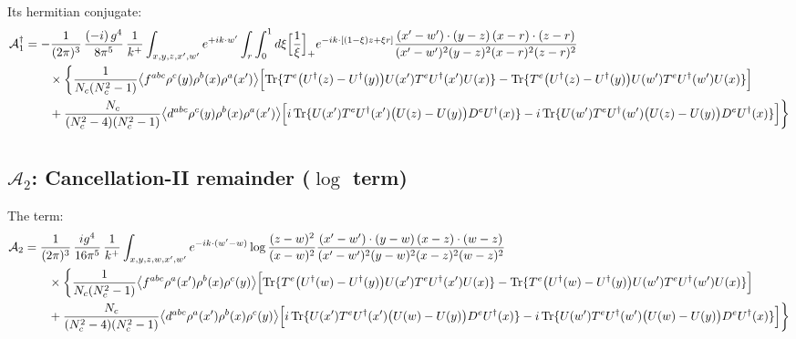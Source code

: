 \documentclass[10pt]{article}
\begin{document}
\noindent Its hermitian conjugate:
\begin{align}
\mathcal{A}_{1}^{\dagger}&=-\frac{1}{(2\pi)^{3}}\,\frac{(-i)\,g^{4}}{8\pi^{5}}\,\frac{1}{k^{+}}\int_{x,y,z,x',w'}e^{+ik\cdot w'}\int_{r}\int_{0}^{1}d\xi\Big[\frac1\xi\Big]_{+}e^{-ik\cdot[(1-\xi)z+\xi r]}\frac{(x'-w')\cdot(y-z)\,(x-r)\cdot(z-r)}{(x'-w')^{2}(y-z)^{2}(x-r)^{2}(z-r)^{2}}\notag\\
&\qquad\times\bigg\{\frac{1}{N_{c}(N_{c}^{2}-1)}\big\langle f^{abc}\rho^{c}(y)\rho^{b}(x)\rho^{a}(x')\big\rangle\Big[{\rm Tr}\{T^{e}\big(U^{\dagger}(z)-U^{\dagger}(y)\big)U(x')T^{e}U^{\dagger}(x')U(x)\}-{\rm Tr}\{T^{e}\big(U^{\dagger}(z)-U^{\dagger}(y)\big)U(w')T^{e}U^{\dagger}(w')U(x)\}\Big]\notag\\&\qquad+\frac{N_{c}}{(N_{c}^{2}-4)(N_{c}^{2}-1)}\big\langle d^{abc}\rho^{c}(y)\rho^{b}(x)\rho^{a}(x')\big\rangle\Big[i\,{\rm Tr}\{U(x')T^{e}U^{\dagger}(x')\big(U(z)-U(y)\big)D^{e}U^{\dagger}(x)\}-i\,{\rm Tr}\{U(w')T^{e}U^{\dagger}(w')\big(U(z)-U(y)\big)D^{e}U^{\dagger}(x)\}\Big]\bigg\}\notag\\[6pt]
\end{align}

\subsection*{$\mathcal{A}_{2}$: Cancellation-II remainder ($\log$ term)}
\noindent The term:
\begin{align}
\mathcal{A}_{2}&=\frac{1}{(2\pi)^{3}}\,\frac{ig^{4}}{16\pi^{5}}\,\frac{1}{k^{+}}\int_{x,y,z,w,x',w'}e^{-ik\cdot(w'-w)}\log\frac{(z-w)^{2}}{(x-w)^{2}}\frac{(x'-w')\cdot(y-w)\,(x-z)\cdot(w-z)}{(x'-w')^{2}(y-w)^{2}(x-z)^{2}(w-z)^{2}}\notag\\
&\qquad\times\bigg\{\frac{1}{N_{c}(N_{c}^{2}-1)}\big\langle f^{abc}\rho^{a}(x')\rho^{b}(x)\rho^{c}(y)\big\rangle\Big[{\rm Tr}\{T^{e}\big(U^{\dagger}(w)-U^{\dagger}(y)\big)U(x')T^{e}U^{\dagger}(x')U(x)\}-{\rm Tr}\{T^{e}\big(U^{\dagger}(w)-U^{\dagger}(y)\big)U(w')T^{e}U^{\dagger}(w')U(x)\}\Big]\notag\\&\qquad+\frac{N_{c}}{(N_{c}^{2}-4)(N_{c}^{2}-1)}\big\langle d^{abc}\rho^{a}(x')\rho^{b}(x)\rho^{c}(y)\big\rangle\Big[i\,{\rm Tr}\{U(x')T^{e}U^{\dagger}(x')\big(U(w)-U(y)\big)D^{e}U^{\dagger}(x)\}-i\,{\rm Tr}\{U(w')T^{e}U^{\dagger}(w')\big(U(w)-U(y)\big)D^{e}U^{\dagger}(x)\}\Big]\bigg\}\notag\\[6pt]
\end{align}
\end{document}
